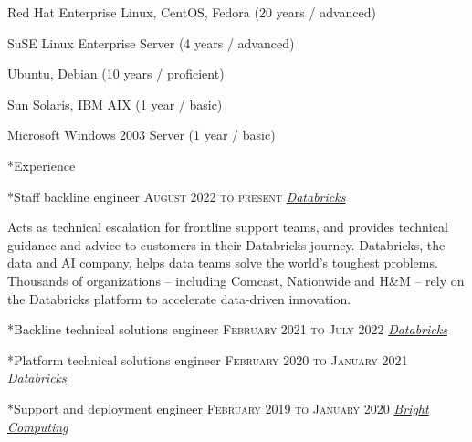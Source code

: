 \documentclass[10pt, a4paper, final]{article}
\begin{document}
\begin{minipage}[t]{0.32\linewidth}
\begin{section}
\begin{subsection}
\begin{compactitem}
        \item Red Hat Enterprise Linux, CentOS, Fedora (20 years / advanced) 
        \item SuSE Linux Enterprise Server (4 years / advanced) 
        \item Ubuntu, Debian (10 years / proficient) 
        \item Sun Solaris, IBM AIX (1 year / basic) 
        \item Microsoft Windows 2003 Server (1 year / basic) 
      \end{compactitem}
    \end{subsection}
  \end{section}
\end{minipage}
\hfill
\begin{minipage}[t]{0.65\linewidth}
  \begin{section}*{Experience}
    \begin{subsection}*{Staff backline engineer \hfill\textsc{August 2022 to present}}
      \href{https://databricks.com/}{\textit{Databricks}}  

      Acts as technical escalation for frontline support teams, and provides technical guidance and advice to customers in their Databricks journey. Databricks, the data and AI company, helps data teams solve the world's toughest problems. Thousands of organizations -- including Comcast, Nationwide and H{\&}M -- rely on the Databricks platform to accelerate data-driven innovation.
    \end{subsection}
    \vspace{1em}
  
    \begin{subsection}*{Backline technical solutions engineer \hfill\textsc{February 2021 to July 2022}}
      \href{https://databricks.com/}{\textit{Databricks}}  
    \end{subsection}
    \vspace{1em}
  
    \begin{subsection}*{Platform technical solutions engineer \hfill\textsc{February 2020 to January 2021}}
      \href{https://databricks.com/}{\textit{Databricks}}  
    \end{subsection}
    \vspace{1em}
  
    \begin{subsection}*{Support and deployment engineer \hfill\textsc{February 2019 to January 2020}}
      \href{https://www.brightcomputing.com/}{\textit{Bright Computing}}  


\end{subsection}
\end{section}
\end{minipage}
\end{document}
